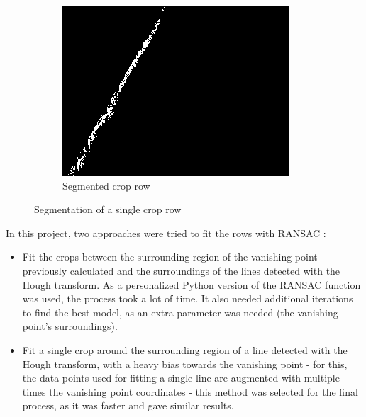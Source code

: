 \begin{figure}[H]
\begin{subfigure}{0.3\textwidth}
\end{subfigure}
\begin{subfigure}{0.3\textwidth}%
    \includegraphics[width=\textwidth]{Report/images/VEGCROPSEG.png}
    \caption{Segmented crop row}
    \label{fig:third}

\end{subfigure}

\caption{Segmentation of a single crop row}
\end{figure}
\label{pics: Ransacmasking}



In this project, two approaches were tried to fit the rows with RANSAC : 


\begin{itemize}
  \item Fit the crops between the surrounding region of the vanishing point previously calculated and the surroundings of the lines detected with the Hough transform. As a personalized Python version of the RANSAC function was used, the process took a lot of time. It also needed additional iterations to find the best model, as an extra parameter was needed (the vanishing point's surroundings).
  
  \item Fit a single crop around the surrounding region of a line detected with the Hough transform, with a heavy bias towards the vanishing point - for this, the data points used for fitting a single line are augmented with multiple times the vanishing point coordinates - this method was selected for the final process, as it was faster and gave similar results.
\end{itemize}

